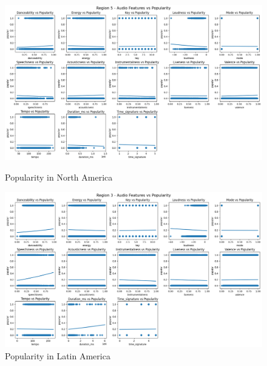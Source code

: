\begin{figure}[h]
    \begin{minipage}{0.45\textwidth}
        \centering
        \includegraphics[width=\linewidth]{media/region5_cleaned.png}
        \caption{Popularity in North America}
        \label{north_america}
    \end{minipage}%
    \hspace{0.05\textwidth}
    \begin{minipage}{0.45\textwidth}
        \centering
        \includegraphics[width=\linewidth]{media/region3_cleaned.png}
        \caption{Popularity in Latin America}
        \label{latin_america}
    \end{minipage}
\end{figure}

\clearpage %

